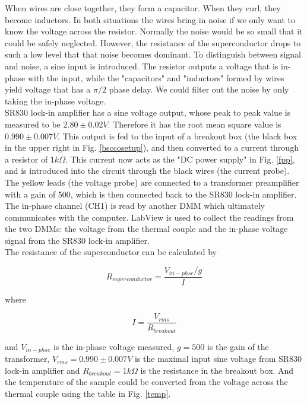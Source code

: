 \documentclass[prb,preprint]{revtex4-1}
\begin{document}
When wires are close together, they form a capacitor. When they curl, they become inductors. In both situations the wires bring in noise if we only want to know the voltage across the resistor. Normally the noise would be so small that it could be safely neglected. However, the resistance of the superconductor drops to such a low level that that noise becomes dominant. To distinguish between signal and noise, a sine input is introduced. The resistor outputs a voltage that is in-phase with the input, while the "capacitors" and "inductors" formed by wires yield voltage that has a $\pi/2$ phase delay. We could filter out the noise by only taking the in-phase voltage. \\

SR830 lock-in amplifier has a sine voltage output, whose peak to peak value is measured to be $2.80 \pm 0.02 V$. Therefore it has the root mean square value is $0.990\pm0.007V$. This output is fed to the input of a breakout box (the black box in the upper right in Fig. \ref{bsccosetup}), and then converted to a current through a resistor of $1k\Omega$. This current now acts as the "DC power supply" in Fig. \ref{fpp}, and is introduced into the circuit through the black wires (the current probe). The yellow leads (the voltage probe) are connected to a transformer preamplifier with a gain of 500, which is then connected back to the SR830 lock-in amplifier. The in-phase channel (CH1) is read by another DMM which ultimately communicates with the computer. LabView is used to collect the readings from the two DMMs: the voltage from the thermal couple and the in-phase voltage signal from the SR830 lock-in amplifier. \\

The resistance of the superconductor can be calculated by

\begin{equation}
R_{superconductor} = \frac{V_{in-phse}/g}{I}
\label{rofs}
\end{equation}

where

\begin{equation}
I=\frac{V_{rms}}{R_{breakout}}
\label{current}
\end{equation}

and $V_{in-phse}$ is the in-phase voltage measured, $g=500$ is the gain of the transformer, $V_{rms}=0.990\pm0.007V$ is the maximal input sine voltage from SR830 lock-in amplifier and $R_{breakout}=1k\Omega$ is the resistance in the breakout box. And the temperature of the sample could be converted from the voltage across the thermal couple using the table in Fig. \ref{temp}.\\
\end{document}

